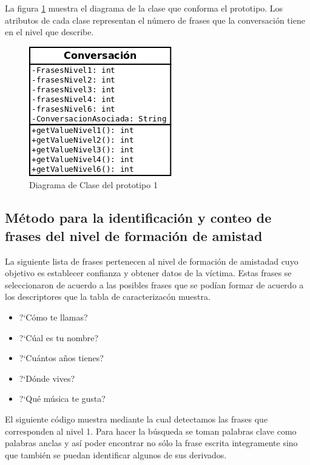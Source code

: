 La figura \ref{fig:diagramaDeClase} muestra el diagrama de la clase que conforma el prototipo. Los atributos de cada clase representan el n\'umero de frases que la conversaci\'on tiene en el nivel que describe.
\begin{figure}[h]
	\begin{center}
	\includegraphics[scale=.4]{images/claseprotipo2}
	\caption{Diagrama de Clase del prototipo 1}
	\label{fig:diagramaDeClase}
	\end{center}
	\end{figure}



\subsection{M\'etodo para la identificaci\'on y conteo de frases del nivel de formaci\'on de amistad}
La siguiente lista de frases pertenecen al nivel de formaci\'on de amistadad cuyo objetivo es establecer confianza y obtener datos de la v\'ictima. Estas frases se seleccionaron de acuerdo a las posibles frases que se pod\'ian formar de acuerdo a los descriptores que la tabla de caracterizac\'on muestra.

\begin{itemize}
\item ?`C\'omo te llamas?
\item ?`C\'ual es tu nombre?
\item ?`Cu\'antos a\~nos tienes?
\item ?`D\'onde vives?
\item ?`Qu\'e m\'usica te gusta?
\end{itemize}


El siguiente c\'odigo muestra mediante la cual detectamos las frases que corresponden al nivel 1. Para hacer la b\'usqueda se toman palabras clave como palabras anclas y as\'i poder encontrar no s\'olo la frase escrita integramente sino que tambi\'en se puedan identificar algunos de sus derivados.


